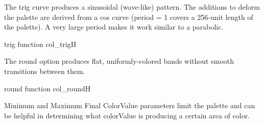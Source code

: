 The trig curve produces a sinusoidal (wave-like) pattern. The additions to deform the palette are derived from a cos curve (period = 1 covers a 256-unit length of the palette). A very large period makes it work similar to a parabolic.

{trig function}
{col_trig}{H}

The round option produces flat, uniformly-colored bands without smooth transitions between them.

{round function}
{col_round}{H}

Minimum and Maximum Final ColorValue parameters limit the palette and can be helpful in determining what colorValue is producing a certain area of color.







